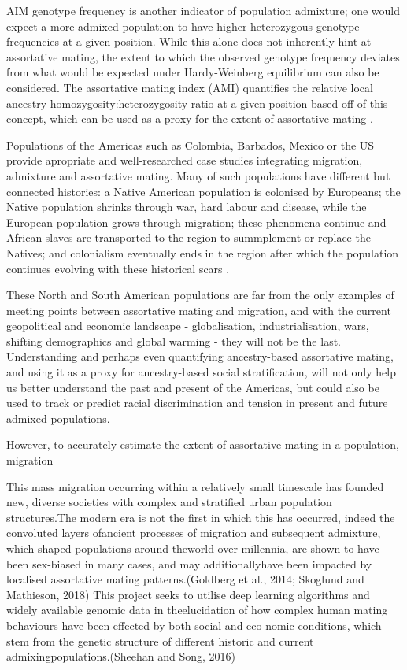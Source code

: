 \documentclass[11pt]{article}
\begin{document}
AIM genotype frequency is another indicator of population admixture; one would expect a more admixed population to have higher heterozygous genotype frequencies at a given position. While this alone does not inherently hint at assortative mating, the extent to which the observed genotype frequency deviates from what would be expected under Hardy-Weinberg equilibrium can also be considered. The assortative mating index (AMI) quantifies the relative local ancestry homozygosity:heterozygosity ratio at a given position based off of this concept, which can be used as a proxy for the extent of assortative mating \parencite{Norris2019}.

Populations of the Americas such as Colombia, Barbados, Mexico or the US provide apropriate and well-researched case studies integrating migration, admixture and assortative mating. Many of such populations have different but connected histories: a Native American population is colonised by Europeans; the Native population shrinks through war, hard labour and disease, while the European population grows through migration; these phenomena continue and African slaves are transported to the region to summplement or replace the Natives; and colonialism eventually ends in the region after which the population continues evolving with these historical scars \parencite{Bryc2010,Mas-Sandoval2019,ESilva2020}. 

These North and South American populations are far from the only examples of meeting points between assortative mating and migration, and with the current geopolitical and economic landscape - globalisation, industrialisation, wars, shifting demographics and global warming - they will not be the last. Understanding and perhaps even quantifying ancestry-based assortative mating, and using it as a proxy for ancestry-based social stratification, will not only help us better understand the past and present of the Americas, but could also be used to track or predict racial discrimination and tension in present and future admixed populations.

However, to accurately estimate the extent of assortative mating in a population, migration 

This  mass  migration  occurring  within  a  relatively  small  timescale  has  founded new, diverse societies with complex and stratified urban population structures.The  modern  era  is  not  the  first  in  which  this  has  occurred,  indeed  the  convoluted  layers  ofancient processes of migration and subsequent admixture,  which shaped populations around theworld  over  millennia,  are  shown  to  have  been  sex-biased  in  many  cases,  and  may  additionallyhave been impacted by localised assortative mating patterns.(Goldberg et al., 2014; Skoglund and Mathieson, 2018) This project seeks to utilise deep learning algorithms and widely available genomic data in theelucidation of how complex human mating behaviours have been effected by both social and eco-nomic conditions, which stem from the genetic structure of different historic and current admixingpopulations.(Sheehan and Song, 2016)
\end{document}
